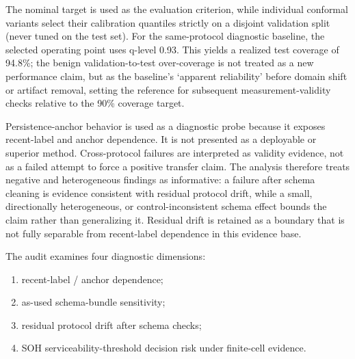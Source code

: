 \documentclass[
  number,
  preprint]{elsarticle}
\providecommand{\tightlist}{%
  \setlength{\itemsep}{0pt}\setlength{\parskip}{0pt}}
\begin{document}
The nominal target is used as the evaluation criterion, while individual
conformal variants select their calibration quantiles strictly on a
disjoint validation split (never tuned on the test set). For the
same-protocol diagnostic baseline, the selected operating point uses
q-level 0.93. This yields a realized test coverage of 94.8\%; the benign
validation-to-test over-coverage is not treated as a new performance
claim, but as the baseline's `apparent reliability' before domain shift
or artifact removal, setting the reference for subsequent
measurement-validity checks relative to the 90\% coverage target.

Persistence-anchor behavior is used as a diagnostic probe because it
exposes recent-label and anchor dependence. It is not presented as a
deployable or superior method. Cross-protocol failures are interpreted
as validity evidence, not as a failed attempt to force a positive
transfer claim. The analysis therefore treats negative and heterogeneous
findings as informative: a failure after schema cleaning is evidence
consistent with residual protocol drift, while a small, directionally
heterogeneous, or control-inconsistent schema effect bounds the claim
rather than generalizing it. Residual drift is retained as a boundary
that is not fully separable from recent-label dependence in this
evidence base.

The audit examines four diagnostic dimensions:

\begin{enumerate}
\def\labelenumi{\arabic{enumi}.}
\tightlist
\item
  recent-label / anchor dependence;
\item
  as-used schema-bundle sensitivity;
\item
  residual protocol drift after schema checks;
\item
  SOH serviceability-threshold decision risk under finite-cell evidence.
\end{enumerate}
\end{document}

